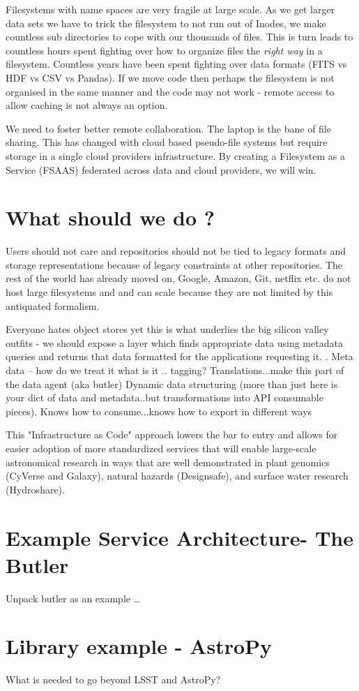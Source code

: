 Filesystems with name spaces are very fragile at large scale. As we get larger data sets we have to trick the filesystem to not run out of Inodes, we make countless sub directories to cope with our thousands of files.
This is turn leads to countless hours spent fighting over how to organize files  the \emph{right way} in a filesystem.
Countless years have been spent fighting over data formats (FITS vs HDF vs CSV vs Pandas).
If we move code then perhaps the filesystem is not organised in the same manner and the code may not work - remote access to allow caching is not always an option.

We need to foster better remote collaboration.  The laptop is the bane of file sharing.
This has changed with cloud based pseudo-file systems but require storage in a single
cloud providers infrastructure. By creating a Filesystem as a Service (FSAAS) federated
across data and cloud providers, we will win.


\section{What should  we do ?}
Users should not care and repositories should not be tied to legacy formats  and storage representations because of legacy constraints  at other repositories.
The rest of the world has already moved on,  Google, Amazon, Git, netflix etc. do not host large filesystems and and can scale because they are not limited by this antiquated formalism.

Everyone hates object stores  yet this is what underlies the big silicon valley outfits - we should expose a layer which finds appropriate data using metadata queries and returns that data formatted for the applications requesting it.
.
Meta data -- how do we treat it what is it ..  tagging?  Translations...make this part of the data agent (aka butler)
Dynamic data structuring (more than just here is your dict of data and metadata..but transformations into API consumable pieces).  Knows how to consume...knows how to export in different ways

This "Infrastructure as Code" \citep{morris2016infrastructure} approach lowers the bar to entry
and allows for easier adoption of more standardized services that will enable large-scale
astronomical research in ways that are well demonstrated in plant genomics (CyVerse and Galaxy), natural hazards (Designsafe), and surface water research (Hydroshare).


\section{Example Service Architecture- The Butler}
Unpack butler as an example …

\section{Library example - AstroPy}
What is needed to go beyond LSST and AstroPy?


